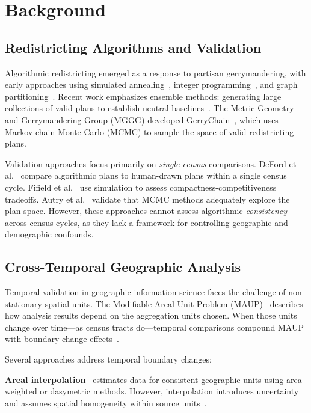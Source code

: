 \section{Background}
\label{sec:background}

\subsection{Redistricting Algorithms and Validation}

Algorithmic redistricting emerged as a response to partisan gerrymandering, with early approaches using simulated annealing~\cite{altman1998}, integer programming~\cite{mehrotra1998}, and graph partitioning~\cite{ricca2008}. Recent work emphasizes ensemble methods: generating large collections of valid plans to establish neutral baselines~\cite{duchin2018}. The Metric Geometry and Gerrymandering Group (MGGG) developed GerryChain~\cite{gerrychain2018}, which uses Markov chain Monte Carlo (MCMC) to sample the space of valid redistricting plans.

Validation approaches focus primarily on \textit{single-census} comparisons. DeFord et al.~\cite{deford2021} compare algorithmic plans to human-drawn plans within a single census cycle. Fifield et al.~\cite{fifield2020} use simulation to assess compactness-competitiveness tradeoffs. Autry et al.~\cite{autry2021} validate that MCMC methods adequately explore the plan space. However, these approaches cannot assess algorithmic \textit{consistency} across census cycles, as they lack a framework for controlling geographic and demographic confounds.

\subsection{Cross-Temporal Geographic Analysis}

Temporal validation in geographic information science faces the challenge of non-stationary spatial units. The Modifiable Areal Unit Problem (MAUP)~\cite{openshaw1984} describes how analysis results depend on the aggregation units chosen. When those units change over time—as census tracts do—temporal comparisons compound MAUP with boundary change effects~\cite{flowerdew1991}.

Several approaches address temporal boundary changes:

\textbf{Areal interpolation}~\cite{goodchild1980} estimates data for consistent geographic units using area-weighted or dasymetric methods. However, interpolation introduces uncertainty and assumes spatial homogeneity within source units~\cite{mennis2003}.

